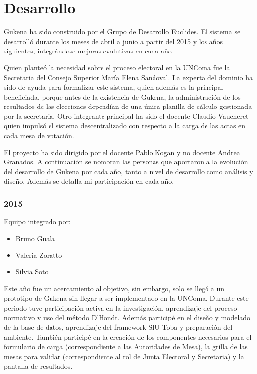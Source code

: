 \section{Desarrollo}
\label{DesarrolloGukena}

Gukena ha sido construido por el Grupo de Desarrollo Euclides. El sistema se desarrolló durante los meses de abril a junio a partir del 2015 y los años siguientes, integrándose mejoras evolutivas en cada año.

Quien planteó la necesidad sobre el proceso electoral en la UNComa fue la Secretaria del Consejo Superior María Elena Sandoval. La experta del dominio ha sido de ayuda para formalizar este sistema, quien además es la principal beneficiada, porque antes de la existencia de Gukena, la administración de los resultados de las elecciones dependían de una única planilla de cálculo gestionada por la secretaria. Otro integrante principal ha sido el docente Claudio Vaucheret quien impulsó el sistema descentralizado con respecto a la carga de las actas en cada mesa de votación.

El proyecto ha sido dirigido por el docente Pablo Kogan y no docente Andrea Granados. \newline
A continuación se nombran las personas que aportaron a la evolución del desarrollo de Gukena por cada año, tanto a nivel de desarrollo como análisis y diseño. Además se detalla mi participación en cada año.
\subsubsection{2015}
Equipo integrado por:
\begin{itemize}
    \item Bruno Guala
    \item Valeria Zoratto
    \item Silvia Soto
\end{itemize}

Este año fue un acercamiento al objetivo, sin embargo, solo se llegó a un prototipo de Gukena sin llegar a ser implementado en la UNComa. Durante este periodo tuve participación activa en la investigación, aprendizaje del proceso normativo y uso del método D'Hondt. Además participé en el diseño y modelado de la base de datos, aprendizaje del framework SIU Toba y preparación del ambiente. También participé en la creación de los componentes necesarios para el formulario de carga (correspondiente a las Autoridades de Mesa), la grilla de las mesas para validar (correspondiente al rol de Junta Electoral y Secretaria) y la pantalla de resultados.

